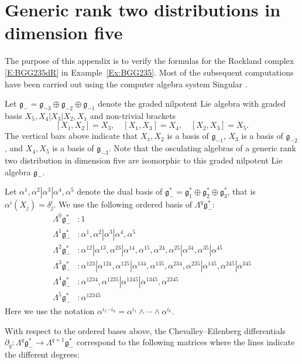 \documentclass[reqno,12pt]{amsart}
\newcommand\goe{\mathfrak g}
\theoremstyle{plain}
\theoremstyle{definition}
\begin{document}
\section{Generic rank two distributions in dimension five}\label{A:G2}








The purpose of this appendix is to verify the formulas for the Rockland complex \eqref{E:BGG235dR} in Example~\ref{Ex:BGG235}.
Most of the subsequent computations have been carried out using the computer algebra system Singular \cite{DGPS16}.


Let $\goe_-=\goe_{-3}\oplus\goe_{-2}\oplus\goe_{-1}$ denote the graded nilpotent Lie algebra with graded basis $X_5,X_4|X_3|X_2,X_1$ and non-trivial brackets
$$
[X_1,X_2]=X_3,\quad[X_1,X_3]=X_4,\quad[X_2,X_3]=X_5.
$$
The vertical bars above indicate that $X_1,X_2$ is a basis of $\goe_{-1}$, $X_3$ is a basis of $\goe_{-2}$, and $X_4,X_5$ is a basis of $\goe_{-3}$.
Note that the osculating algebras of a generic rank two distribution in dimension five are isomorphic to this graded nilpotent Lie algebra $\goe_-$.


Let $\alpha^1,\alpha^2|\alpha^3|\alpha^4,\alpha^5$ denote the dual basis of $\goe^*_-=\goe^*_1\oplus\goe^*_2\oplus\goe^*_3$, that is $\alpha^i(X_j)=\delta^i_j$.
We use the following ordered basis of $\Lambda^q\goe^*_-$:
\begin{align*}
\Lambda^0\goe^*_-&:1\\
\Lambda^1\goe^*_-&:\alpha^1,\alpha^2|\alpha^3|\alpha^4,\alpha^5\\
\Lambda^2\goe^*_-&:\alpha^{12}|\alpha^{13},\alpha^{23}|\alpha^{14},\alpha^{15},\alpha^{24},\alpha^{25}|\alpha^{34},\alpha^{35}|\alpha^{45}\\
\Lambda^3\goe^*_-&:\alpha^{123}|\alpha^{124},\alpha^{125}|\alpha^{134},\alpha^{135},\alpha^{234},\alpha^{235}|\alpha^{145},\alpha^{245}|\alpha^{345}\\
\Lambda^4\goe^*_-&:\alpha^{1234},\alpha^{1235}|\alpha^{1245}|\alpha^{1345},\alpha^{2345}\\
\Lambda^5\goe^*_-&:\alpha^{12345}
\end{align*}
Here we use the notation $\alpha^{i_1\cdots i_k}=\alpha^{i_1}\wedge\cdots\wedge\alpha^{i_k}$.


With respect to the ordered bases above, the Chevalley--Eilenberg differentials $\partial_q\colon\Lambda^q\goe^*_-\to\Lambda^{q+1}\goe^*_-$
correspond to the following matrices where the lines indicate the different degrees:
\end{document}
